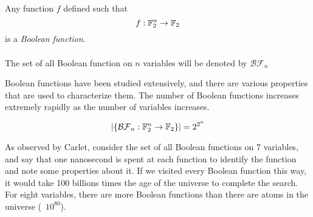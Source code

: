 \begin{definition}
\label{def:boolean-function}
  Any function $f$ defined such that 
  \begin{equation*}
    f:\mathbb{F}_2^n\rightarrow\mathbb{F}_2
  \end{equation*}
  is a {\em Boolean function}.\\
	\\
	The set of all Boolean function on $n$ variables will be denoted by $\mathcal{BF}_n$
\end{definition}

\par Boolean functions have been studied extensively, and there are various properties that
are used to characterize them. The number of Boolean functions increases extremely rapidly
as the number of variables increases.

\begin{equation}
  \lvert\{\mathcal{BF}_n:\mathbb{F}_2^n\rightarrow\mathbb{F}_2\}\rvert = 2^{2^n}
\end{equation}

\par As observed by Carlet, consider the set of all Boolean functions on 7 variables,
and say that one nanosecond is spent at each function to identify the function and
note some properties about it. If we visited every Boolean function this way, it
would take 100 billions times the age of the universe to complete the search.
For eight variables, there are more Boolean functions than there are atoms in the
universe (~$10^{80}$).

